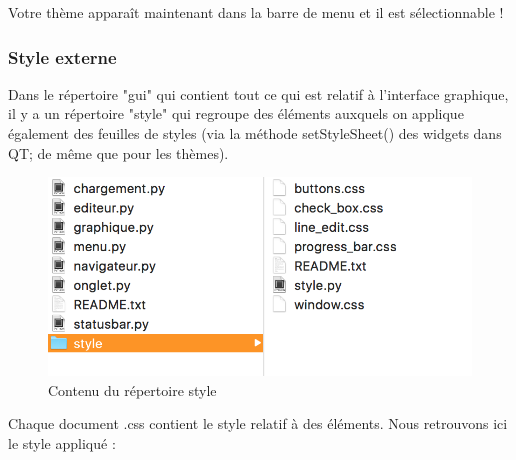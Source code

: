 \documentclass[a4paper,12pt]{article}
\begin{document}
			Votre thème apparaît maintenant dans la barre de menu et il est sélectionnable !
					
			\subsubsection{Style externe}
	
		Dans le répertoire "gui" qui contient tout ce qui est relatif à l'interface graphique, il y a un répertoire "style" qui regroupe des éléments auxquels on applique également des feuilles de styles (via la méthode setStyleSheet() des widgets dans QT; de même que pour les thèmes).
		
		\begin{figure}[h!]
			\begin{center}
				\includegraphics[scale=0.5]{images/imgs_themes/style}
				\caption{Contenu du répertoire style}
			\end{center}
		\end{figure}
				
		Chaque document .css contient le style relatif à des éléments. Nous retrouvons ici le style appliqué :
		
\end{document}
